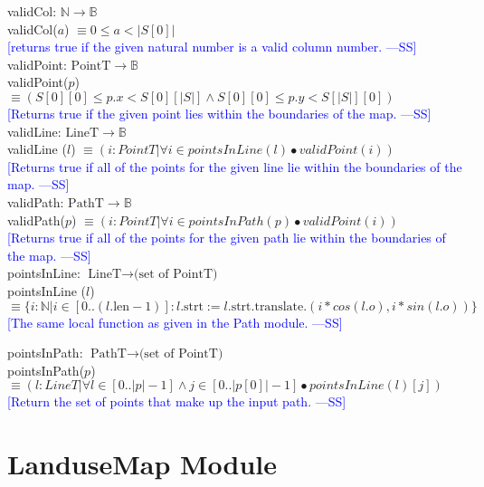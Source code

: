 \documentclass[12pt]{article}
\newcommand{\authornote}[3]{\textcolor{#1}{[#3 ---#2]}}
\newcommand{\authornote}[3]{}
\newcommand{\wss}[1]{\authornote{blue}{SS}{#1}}
\begin{document}
\noindent validCol: $\mathbb{N} \rightarrow \mathbb{B}$\\
\noindent  validCol($a$) $\equiv 0 \leq a < |S[0]|$\\ \wss{returns true if the given natural number is a valid column
  number.}\\

\noindent validPoint: $\mbox{PointT} \rightarrow \mathbb{B}$\\
\noindent validPoint($p$)$ \equiv (S[0][0] \leq p.x < S[0][ |S| ] \land S[0][0] \leq p.y < S[ |S| ][0] )$ \\ \wss{Returns true if the given point lies within the boundaries of the
  map.}\\

\noindent validLine: $\mbox{LineT} \rightarrow \mathbb{B}$\\
\noindent validLine ($l$) $\equiv (i : PointT | \forall i \in pointsInLine(l) \bullet validPoint(i))$ \\ \wss{Returns true if all of the points for the given line lie within the boundaries of the
  map.}\\

\noindent validPath: $\mbox{PathT} \rightarrow \mathbb{B}$\\
\noindent validPath($p$) $\equiv (i : PointT | \forall i \in pointsInPath(p) \bullet validPoint(i))$ \\ \wss{Returns true if all of the points for the given path lie within the boundaries of the
  map.}\\

\noindent pointsInLine: $\mbox{LineT} \rightarrow \mbox{(set of PointT)}$\\
\noindent pointsInLine ($l$) $ \equiv \{ i: \mathbb{N} | i \in [0
.. (l.\mbox{len} - 1)] : l.\mbox{strt}:= l.\mbox{strt}.\mbox{translate}.(i*cos(l.o), i*sin(l.o))\}$ \\
\wss{The same local function as given in the Path module.}

\noindent pointsInPath: $\mbox{PathT} \rightarrow \mbox{(set of PointT)}$\\
\noindent pointsInPath($p$) $ \equiv (l : LineT| \forall l \in [0..|p|-1] \land j \in [0..|p[0]|-1] \bullet pointsInLine(l)[j])$ \\
\wss{Return the set of points that make up the input path.}
\newpage

\section* {LanduseMap Module}
\end{document}
